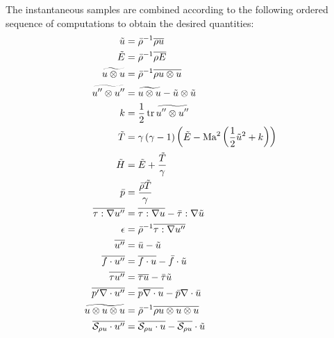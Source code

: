 The instantaneous samples are combined according to the following ordered
sequence of computations to obtain the desired quantities:
{ \allowdisplaybreaks[1]
\begin{align}
  \tilde{u} &= \bar{\rho}^{-1} \overline{\rho{}u}
\\
  \tilde{E} &= \bar{\rho}^{-1} {\overline{\rho{}E}}
\\
  \widetilde{u\otimes{}u} &= \bar{\rho}^{-1} \overline{\rho{}u\otimes{}u}
\\
  \widetilde{u''\otimes{}u''} &=
  \widetilde{u\otimes{}u} - \tilde{u}\otimes\tilde{u}
\\
  k &= \frac{1}{2} \operatorname{tr} \widetilde{u''\otimes{}u''}
\\
  \tilde{T} &= \gamma\left(\gamma-1\right)\left(
      \tilde{E} - \mbox{Ma}_{}^2\left(\frac{1}{2}\tilde{u}^2 + k\right)
  \right)
\\
  \tilde{H} &= \tilde{E} + \frac{\tilde{T}}{\gamma}
\\
  \bar{p} &= \frac{\bar{\rho}\tilde{T}}{\gamma}
\\
  \overline{\tau:\nabla{}u''} &=
  \overline{\tau:\nabla{}u} - \bar{\tau}:\nabla\tilde{u}
\\
  \epsilon &= \bar{\rho}^{-1} \overline{\tau:\nabla{}u''}
\\
  \overline{u''} &= \bar{u} - \tilde{u}
\\
  \overline{f\cdot{}u''} &= \overline{f\cdot{}u} - \bar{f}\cdot{}\tilde{u}
\\
  \overline{\tau{}u''} &= \overline{\tau{}u} - \bar{\tau}\tilde{u}
\\
  \overline{p'\nabla\cdot{}u''}
  &= \overline{p\nabla\cdot{}u}
   - \bar{p}\nabla\cdot\bar{u}
\\
  \widetilde{u\otimes{}u\otimes{}u}
  &= \bar{\rho}^{-1} \overline{\rho{}u\otimes{}u\otimes{}u}
\\
  \overline{\mathcal{S}_{\rho{} u}\cdot{}u''} 
  &= \overline{\mathcal{S}_{\rho{} u}\cdot{}u} 
   - \overline{\mathcal{S}_{\rho{} u}}\cdot{}\tilde{u}
\end{align}
}

